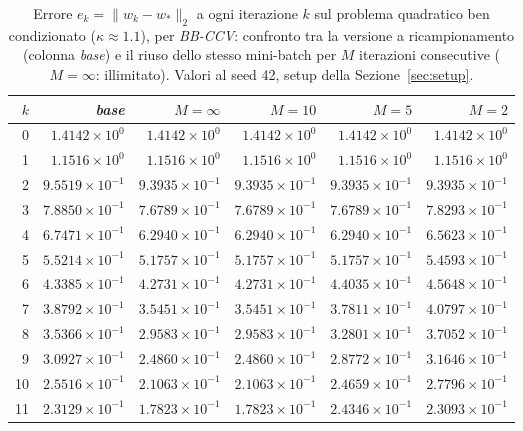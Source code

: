 \begin{table}[H]
\centering
\footnotesize
\renewcommand{\arraystretch}{0.85}
\setlength{\tabcolsep}{4pt}
\caption{Errore $e_k=\|w_k-w_*\|_2$ a ogni iterazione $k$ sul problema quadratico ben condizionato ($\kappa\approx 1.1$), per \emph{BB-CCV}: confronto tra la versione a ricampionamento (colonna \emph{base}) e il riuso dello stesso mini-batch per $M$ iterazioni consecutive ($M=\infty$: illimitato). Valori al seed 42, setup della Sezione~\ref{sec:setup}.}
\label{tab:riuso_bencond_bb}
\begin{tabular}{@{}rrrrrr@{}}
\toprule
$k$ & \emph{base} & $M{=}\infty$ & $M{=}10$ & $M{=}5$ & $M{=}2$\\
\midrule
0 & $1.4142\times10^{0}$ & $1.4142\times10^{0}$ & $1.4142\times10^{0}$ & $1.4142\times10^{0}$ & $1.4142\times10^{0}$\\
1 & $1.1516\times10^{0}$ & $1.1516\times10^{0}$ & $1.1516\times10^{0}$ & $1.1516\times10^{0}$ & $1.1516\times10^{0}$\\
2 & $9.5519\times10^{-1}$ & $9.3935\times10^{-1}$ & $9.3935\times10^{-1}$ & $9.3935\times10^{-1}$ & $9.3935\times10^{-1}$\\
3 & $7.8850\times10^{-1}$ & $7.6789\times10^{-1}$ & $7.6789\times10^{-1}$ & $7.6789\times10^{-1}$ & $7.8293\times10^{-1}$\\
4 & $6.7471\times10^{-1}$ & $6.2940\times10^{-1}$ & $6.2940\times10^{-1}$ & $6.2940\times10^{-1}$ & $6.5623\times10^{-1}$\\
5 & $5.5214\times10^{-1}$ & $5.1757\times10^{-1}$ & $5.1757\times10^{-1}$ & $5.1757\times10^{-1}$ & $5.4593\times10^{-1}$\\
6 & $4.3385\times10^{-1}$ & $4.2731\times10^{-1}$ & $4.2731\times10^{-1}$ & $4.4035\times10^{-1}$ & $4.5648\times10^{-1}$\\
7 & $3.8792\times10^{-1}$ & $3.5451\times10^{-1}$ & $3.5451\times10^{-1}$ & $3.7811\times10^{-1}$ & $4.0797\times10^{-1}$\\
8 & $3.5366\times10^{-1}$ & $2.9583\times10^{-1}$ & $2.9583\times10^{-1}$ & $3.2801\times10^{-1}$ & $3.7052\times10^{-1}$\\
9 & $3.0927\times10^{-1}$ & $2.4860\times10^{-1}$ & $2.4860\times10^{-1}$ & $2.8772\times10^{-1}$ & $3.1646\times10^{-1}$\\
10 & $2.5516\times10^{-1}$ & $2.1063\times10^{-1}$ & $2.1063\times10^{-1}$ & $2.4659\times10^{-1}$ & $2.7796\times10^{-1}$\\
11 & $2.3129\times10^{-1}$ & $1.7823\times10^{-1}$ & $1.7823\times10^{-1}$ & $2.4346\times10^{-1}$ & $2.3093\times10^{-1}$\\

\end{tabular}
\end{table}
